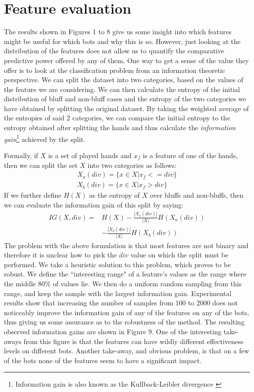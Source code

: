 \documentclass[letterpaper]{article}
\begin{document}
\section{
\fontsize{12pt}{15pt} 
\selectfont
Feature evaluation}
\fontsize{10pt}{12pt} 
\selectfont
The results shown in Figures 1 to 8 give us some insight into which features might be useful for which bots and why this is so. However, just looking at the distribution of the features does not allow us to quantify the comparative predictive power offered by any of them. One way to get a sense of the value they offer is to look at the classification problem from an information theoretic perspective. We can split the dataset into two categories, based on the values of the feature we are considering. We can then calculate the entropy of the initial distribution of bluff and non-bluff cases and the entropy of the two categories we have obtained by splitting the original dataset. By taking the weighted average of the entropies of said 2 categories, we can compare the initial entropy to the entropy obtained after splitting the hands and thus calculate the \emph{information gain}\footnote{Information gain is also known as the Kullback-Leibler divergence \cite{P14}} achieved by the split. 

Formally, if $X$ is a set of played hands and $x_f$ is a feature of one of the hands, then we can split the set $X$ into two categories as follows: 
\begin{gather*}
X_a(div) = \{x \in X | x_f <= div\} \\
X_b(div) = \{x \in X | x_f > div\}
\end{gather*}
If we further define $H(X)$ as the entropy of $X$ over bluffs and non-bluffs, then we can evaluate the information gain of this split by saying: 
\begin{align*}
IG(X,div) = & H(X) - \frac{|X_a(div)|}{|X|} H(X_a(div)) \\
 & - \frac{|X_b(div)|}{|X|} H(X_b(div))
\end{align*}
The problem with the above formulation is that most features are not binary and therefore it is unclear how to pick the $div$ value on which the split must be performed. We take a heuristic solution to this problem, which proves to be robust. We define the ``interesting range" of a feature's values as the range where the middle 80\% of values lie. We then do a uniform random sampling from this range, and keep the sample with the largest information gain. Experimental results show that increasing the number of samples from 100 to 2000 does not noticeably improve the information gain of any of the features on any of the bots, thus giving us some assurance as to the robustness of the method. The resulting observed information gains are shown in Figure 9. One of the interesting take-aways from this figure is that the features can have wildly different effectiveness levels on different bots. Another take-away, and obvious problem, is that on a few of the bots none of the features seem to have a significant impact. 
\end{document}
